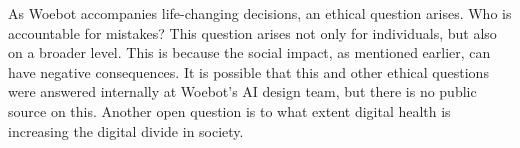 As Woebot accompanies life-changing decisions, an ethical question arises.
Who is accountable for mistakes?
This question arises not only for individuals, but also on a broader level.
This is because the social impact, as mentioned earlier, can have negative consequences.
It is possible that this and other ethical questions were answered internally at Woebot's AI design team, but there is no public source on this.
Another open question is to what extent digital health is increasing the digital divide in society.

